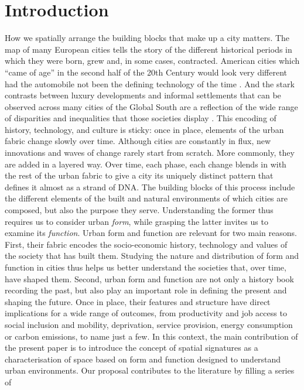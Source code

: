 \section{Introduction}
\label{sec:intro}

How we spatially arrange the building blocks that make up a city matters.
%
The map of many European cities tells the story of the different historical
periods in which they were born, grew and, in some cases, contracted.
%
American cities which ``came of age'' in the second half of the 20th Century
would look very different had the automobile not been the defining
technology of the time \citep{jacobs2016death}.
%
And the stark contrasts between luxury developments and informal settlements
that can be observed across many cities of the Global South are a reflection
of the wide range of disparities and inequalities that those societies
display \citep{alsayyad2003urban}.
%
This encoding of history, technology, and culture is sticky: once in place,
elements of the urban fabric change slowly over time. Although cities are constantly in flux, new
innovations and waves of change rarely start from scratch. More commonly, they
are added in a layered way. Over time, each phase, each change blends in with the rest
of the urban fabric to give a city its uniquely distinct pattern that defines
it almost as a strand of DNA.
The building blocks of this process include the different
elements of the built and natural environments of which cities are composed,
but also the purpose they serve.
Understanding the former thus requires us to consider urban \textit{form}, while
grasping the latter invites us to examine its \textit{function}.
Urban form and function are relevant for two main reasons. First, their fabric
encodes the socio-economic history, technology and values
of the society that has built them.
%
Studying the nature and distribution
of form and function in cities thus helps us better understand the societies
that, over time, have shaped them.
Second, urban form and function are
not only a history book recording the past, but also play an important role in
defining the present and shaping the future.
%
Once in place, their features and structure have direct implications for a
wide range of outcomes, from productivity and job access to social inclusion
and mobility, deprivation, service provision, energy consumption or carbon
emissions, to name just a few.
% 
In this context, the main contribution of the present paper is to
introduce the concept of spatial signatures as a characterisation of
space based on form and function designed to understand urban environments.
Our proposal contributes to the literature by filling a series of

